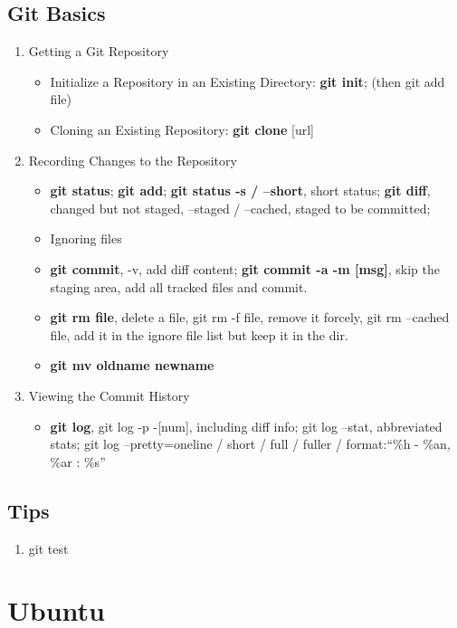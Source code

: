 \documentclass[11pt,twoside,a4paper]{article}
\begin{document}
\subsection{Git Basics} %
\begin{enumerate}
  \item Getting a Git Repository
    \begin{itemize}
      \item Initialize a Repository in an Existing Directory: \textbf{git init}; (then git add file)
      \item Cloning an Existing Repository: \textbf{git clone} [url]
    \end{itemize}
  \item Recording Changes to the Repository
    \begin{itemize}
      \item \textbf{git status}; \textbf{git add}; \textbf{git status -s / --short}, short status; \textbf{git diff}, changed but not staged, --staged / --cached, staged to be committed;
      \item Ignoring files
      \item \textbf{git commit}, -v, add diff content; \textbf{git commit -a -m [msg]}, skip the staging area, add all tracked files and commit.
      \item \textbf{git rm file}, delete a file, git rm -f file, remove it forcely, git rm --cached file, add it in the ignore file list but keep it in the dir.
      \item \textbf{git mv oldname newname}
    \end{itemize}
  \item Viewing the Commit History
    \begin{itemize}
      \item \textbf{git log}, git log -p -[num], including diff info; git log --stat, abbreviated stats; git log --pretty=oneline / short / full / fuller / format:``\%h - \%an, \%ar : \%s''
    \end{itemize}
\end{enumerate}

\subsection{Tips} %
\begin{enumerate}
  \item git test
\end{enumerate}
\newpage


\section{Ubuntu} %
\end{document}
